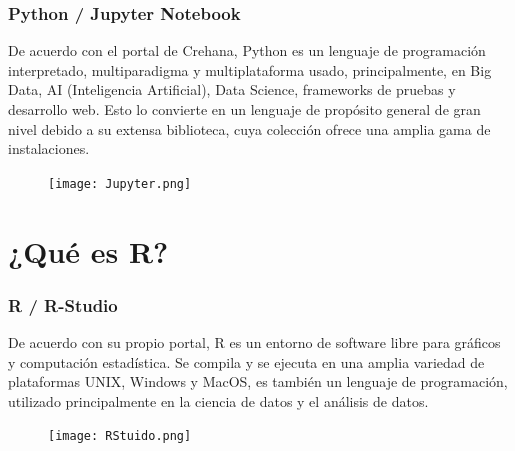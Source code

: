 \documentclass{libs/XJTLU_format}
\begin{document}
\begin{frame}[fragile] 
    \frametitle{Python / Jupyter Notebook}

    \begin{center}
De acuerdo con el portal de Crehana, Python es un lenguaje de programación interpretado, multiparadigma y multiplataforma usado, principalmente, en Big Data, AI (Inteligencia Artificial), Data Science, frameworks de pruebas y desarrollo web. Esto lo convierte en un lenguaje de propósito general de gran nivel debido a su extensa biblioteca, cuya colección ofrece una amplia gama de instalaciones.\newline    
    \end{center}

\begin{multicols}{2}
    \begin{center}
    {\color{yellow}{\small Su uso se da principalmente en una herramienta llamada Jupyter Notebook, cuya funcionalidad es interpretar el código en lenguaje Python (iPython) y mostrar sus resultados a pie de línea de una manera interactiva.}}
    \end{center}
    
    \begin{figure}[H]
            \texttt{[image: Jupyter.png]}
    \end{figure}
\end{multicols}
\end{frame}

\section{¿Qué es R?}

\begin{frame}[fragile] 
    \frametitle{R / R-Studio}

    \begin{center}
De acuerdo con su propio portal, R es un entorno de software libre para gráficos y computación estadística. Se compila y se ejecuta en una amplia variedad de plataformas UNIX, Windows y MacOS, es también un lenguaje de programación, utilizado principalmente en la ciencia de datos y el análisis de datos.\newline    
    \end{center}

\begin{multicols}{2}
    \begin{center}
    {\color{aqua}{\small Tal como en Python, R tiene un intérprete (R-Studio) que permite programar en este lenguaje y mostrar sus resultados en una interfaz de manera interactiva. Aunque, R también está siendo usado en otros sofware para edición de texto, como Visual Studio Code.}}
    \end{center}
    
    \begin{figure}[H]
            \texttt{[image: RStuido.png]}
    \end{figure}
\end{multicols}
\end{frame}
\end{document}
